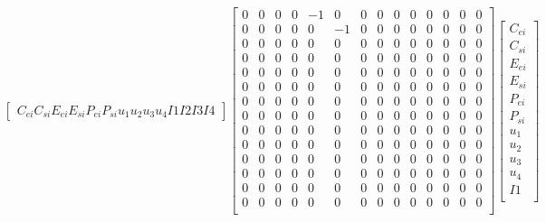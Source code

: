 \documentclass[11pt]{article} %
\begin{document}
\begin{align} 
    &\begin{bmatrix}
        C_{ei} 
        C_{si} 
        E_{ei} 
        E_{si} 
        P_{ei} 
        P_{si} 
        u_1
        u_2
        u_3
        u_4
        I1
        I2
        I3
        I4 
    \end{bmatrix}
    \begin{bmatrix}
        0 & 0 & 0 & 0 & -1 & 0 & 0 & 0 & 0 & 0 & 0 & 0 & 0 & 0 \\
        0 & 0 & 0 & 0 & 0 & -1 & 0 & 0 & 0 & 0 & 0 & 0 & 0 & 0 \\
        0 & 0 & 0 & 0 & 0 & 0 & 0 & 0 & 0 & 0 & 0 & 0 & 0 & 0 \\
        0 & 0 & 0 & 0 & 0 & 0 & 0 & 0 & 0 & 0 & 0 & 0 & 0 & 0 \\
        0 & 0 & 0 & 0 & 0 & 0 & 0 & 0 & 0 & 0 & 0 & 0 & 0 & 0 \\
        0 & 0 & 0 & 0 & 0 & 0 & 0 & 0 & 0 & 0 & 0 & 0 & 0 & 0 \\
        0 & 0 & 0 & 0 & 0 & 0 & 0 & 0 & 0 & 0 & 0 & 0 & 0 & 0 \\
        0 & 0 & 0 & 0 & 0 & 0 & 0 & 0 & 0 & 0 & 0 & 0 & 0 & 0 \\
        0 & 0 & 0 & 0 & 0 & 0 & 0 & 0 & 0 & 0 & 0 & 0 & 0 & 0 \\
        0 & 0 & 0 & 0 & 0 & 0 & 0 & 0 & 0 & 0 & 0 & 0 & 0 & 0 \\
        0 & 0 & 0 & 0 & 0 & 0 & 0 & 0 & 0 & 0 & 0 & 0 & 0 & 0 \\
        0 & 0 & 0 & 0 & 0 & 0 & 0 & 0 & 0 & 0 & 0 & 0 & 0 & 0 \\
        0 & 0 & 0 & 0 & 0 & 0 & 0 & 0 & 0 & 0 & 0 & 0 & 0 & 0 \\
        0 & 0 & 0 & 0 & 0 & 0 & 0 & 0 & 0 & 0 & 0 & 0 & 0 & 0 \\
    \end{bmatrix} 
    \begin{bmatrix}
        C_{ei} \\
        C_{si} \\
        E_{ei} \\
        E_{si} \\
        P_{ei} \\
        P_{si} \\
        u_1\\
        u_2\\
        u_3\\
        u_4\\
        I1\\

\end{bmatrix}
\end{align}
\end{document}
